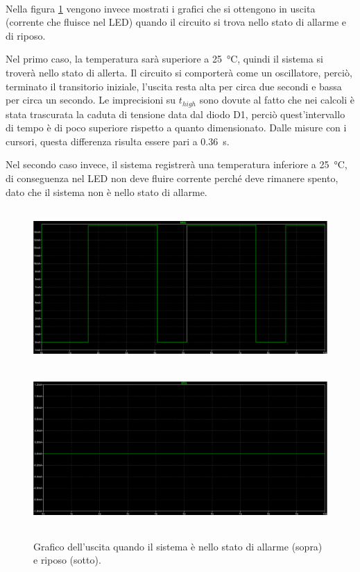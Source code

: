 \documentclass{report}
\begin{document}
\\Nella figura \ref{figura:555out} vengono invece mostrati i grafici che si ottengono in uscita (corrente che fluisce nel LED) quando il circuito si trova nello stato di allarme e di riposo. \par
Nel primo caso, la temperatura sarà superiore a \SI{25}{\degree}C, quindi il sistema si troverà nello stato di allerta. Il circuito si comporterà come un oscillatore, perciò, terminato il transitorio iniziale, l'uscita resta alta per circa due secondi e bassa per circa un secondo. Le imprecisioni su $t_{high}$ sono dovute al fatto che nei calcoli è stata trascurata la caduta di tensione data dal diodo D1, perciò quest'intervallo di tempo è di poco superiore rispetto a quanto dimensionato. Dalle misure con i cursori, questa differenza risulta essere pari a \SI{0.36}{\second}. \par
Nel secondo caso invece, il sistema registrerà una temperatura inferiore a \SI{25}{\degree}C, di conseguenza nel LED non deve fluire corrente perché deve rimanere spento, dato che il sistema non è nello stato di allarme.
\begin{figure}[h!]
	\centering
	\includegraphics[height=6cm]{immagini/555on}
	\includegraphics[height=6cm]{immagini/555off}
	\caption{Grafico dell'uscita quando il sistema è nello stato di allarme (sopra) e riposo (sotto).} 
	\label{figura:555out}
\end{figure}
\end{document}
